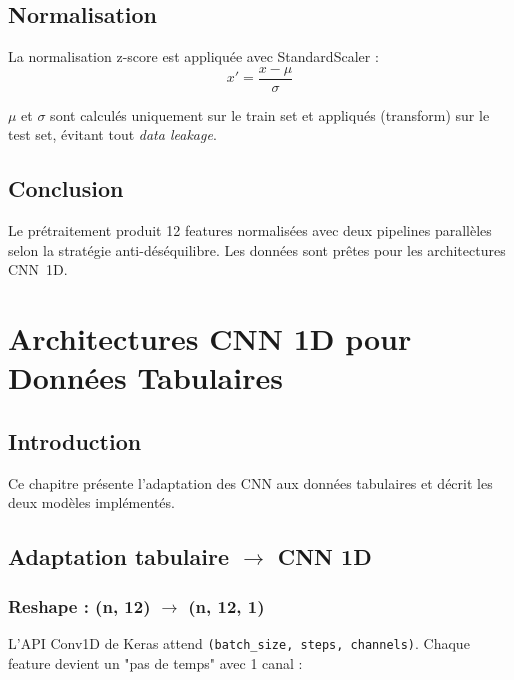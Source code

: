 \documentclass[12pt,a4paper]{report}
\begin{document}
\section{Normalisation}

La normalisation z-score est appliqu\'{e}e avec StandardScaler :
\begin{equation}
x' = \frac{x - \mu}{\sigma}
\end{equation}

$\mu$ et $\sigma$ sont calcul\'{e}s uniquement sur le train set et appliqu\'{e}s (transform) sur le test set, \'{e}vitant tout \textit{data leakage}.

\section{Conclusion}

Le pr\'{e}traitement produit 12 features normalis\'{e}es avec deux pipelines parall\`{e}les selon la strat\'{e}gie anti-d\'{e}s\'{e}quilibre. Les donn\'{e}es sont pr\^{e}tes pour les architectures CNN~1D.

\chapter{Architectures CNN 1D pour Donn\'{e}es Tabulaires}

\section{Introduction}

Ce chapitre pr\'{e}sente l'adaptation des CNN aux donn\'{e}es tabulaires et d\'{e}crit les deux mod\`{e}les impl\'{e}ment\'{e}s.

\section{Adaptation tabulaire $\rightarrow$ CNN 1D}

\subsection{Reshape : (n, 12) $\rightarrow$ (n, 12, 1)}

L'API Conv1D de Keras attend \texttt{(batch\_size, steps, channels)}. Chaque feature devient un "pas de temps" avec 1 canal :
\end{document}
